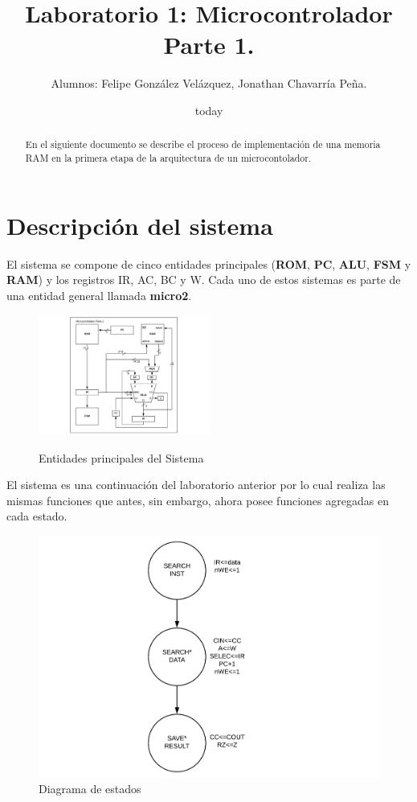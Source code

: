 \documentclass[12pt,letterpapers]{IEEEtran}
\date{today}
\title{Laboratorio 1: Microcontrolador Parte 1.}
\author{Alumnos: Felipe González Velázquez, Jonathan Chavarría Peña.}
\begin{document}
\renewcommand{\leftmark}{UNIVERSIDAD LATINA DE COSTA RICA -- BINGE-57 Arquitectura de Computadores}
\maketitle
	\begin{abstract}
En el  siguiente documento se describe  el proceso de implementación de una memoria RAM en la primera etapa de la arquitectura de un microcontolador. 
	\end{abstract}
\section{Descripción del sistema}
El sistema se compone de cinco entidades principales (\textbf{ROM}, \textbf{PC}, \textbf{ALU}, \textbf {FSM} y \textbf{RAM}) y los registros IR, AC, BC y W. Cada uno de estos sistemas es parte de una entidad general llamada \textbf{micro2}.

	\begin{figure}[H]
		\centering	
		\includegraphics[width=0.5\textwidth]{graph} 
		\label{graph}
		\caption{Entidades principales del Sistema}
	\end{figure} 

El sistema es una continuación del laboratorio anterior por lo cual realiza las mismas funciones que antes, sin embargo, ahora posee funciones agregadas en cada estado.

\begin{figure}[H]
\centering
\includegraphics[scale=0.5]{graph2.pdf}
\caption{Diagrama de estados}
\end{figure}
\end{document}
